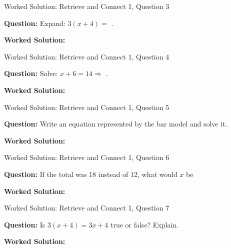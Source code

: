\documentclass{beamer}
\newcommand{\ablank}[1]{%
  \alt<2>{\textcolor{red}{#1}}{\underline{\phantom{#1}}}%
}
\newcommand{\ashow}[1]{\uncover<2->{\textcolor{red}{\small #1}}}
\newcommand{\ashowq}[1]{\alt<2->{\textcolor{red}{\small #1}}{?}}
\begin{document}
\begin{frame}{Worked Solution: Retrieve and Connect 1, Question 3}

\textbf{Question:} Expand: $3(x+4)=$\ablank{$3x+12$}.

\textbf{Worked Solution:} \ashow{Multiply each term inside the bracket by $3$: $3(x+4)=3x+12$.}

\end{frame}

\begin{frame}{Worked Solution: Retrieve and Connect 1, Question 4}

\textbf{Question:} Solve: $x+6=14 \Rightarrow$\ablank{$x=8$}.

\textbf{Worked Solution:} \ashow{Subtract $6$ from both sides: $x=14-6=8$.}

\end{frame}

\begin{frame}{Worked Solution: Retrieve and Connect 1, Question 5}

\textbf{Question:} Write an equation represented by the bar model and solve it.

\textbf{Worked Solution:} \ashow{The two $x$-blocks and the $4$-block make the total $12$, so $2x+4=12$. Subtract $4$: $2x=8$; divide by $2$: $x=4$.}

\end{frame}

\begin{frame}{Worked Solution: Retrieve and Connect 1, Question 6}

\textbf{Question:} If the total was 18 instead of 12, what would $x$ be\ashowq{~$x=7$.}

\textbf{Worked Solution:} \ashow{The model becomes $2x+4=18$. Subtract $4$: $2x=14$, so $x=7$.}

\end{frame}

\begin{frame}{Worked Solution: Retrieve and Connect 1, Question 7}

\textbf{Question:} Is $3(x+4)=3x+4$ true or false? Explain.

\textbf{Worked Solution:} \ashow{False. Expanding $3(x+4)$ gives $3x+12$, not $3x+4$.}

\end{frame}
\end{document}
